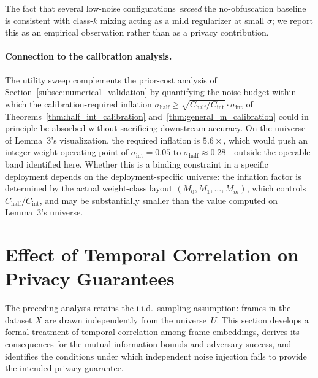 \documentclass[letterpaper]{article} %
\begin{document}
The fact that several low-noise configurations \emph{exceed} the no-obfuscation baseline is consistent with class-$k$ mixing acting as a mild regularizer at small $\sigma$; we report this as an empirical observation rather than as a privacy contribution.

\paragraph{Connection to the calibration analysis.}
The utility sweep complements the prior-cost analysis of Section~\ref{subsec:numerical_validation} by quantifying the noise budget within which the calibration-required inflation $\sigma_{\mathrm{half}} \ge \sqrt{C_{\mathrm{half}}/C_{\mathrm{int}}} \cdot \sigma_{\mathrm{int}}$ of Theorems~\ref{thm:half_int_calibration} and~\ref{thm:general_m_calibration} could in principle be absorbed without sacrificing downstream accuracy. On the universe of Lemma~3's visualization, the required inflation is $5.6\times$, which would push an integer-weight operating point of $\sigma_{\mathrm{int}} = 0.05$ to $\sigma_{\mathrm{half}} \approx 0.28$---outside the operable band identified here. Whether this is a binding constraint in a specific deployment depends on the deployment-specific universe: the inflation factor is determined by the actual weight-class layout $(M_0, M_1, \dots, M_m)$, which controls $C_{\mathrm{half}}/C_{\mathrm{int}}$, and may be substantially smaller than the value computed on Lemma~3's universe.


\section{Effect of Temporal Correlation on Privacy Guarantees}
\label{sec:correlation_analysis}

The preceding analysis retains the i.i.d.\ sampling assumption:
frames in the dataset $X$ are drawn independently from the
universe~$U$. This section develops a formal treatment of
temporal correlation among frame embeddings, derives its
consequences for the mutual information bounds and adversary
success, and identifies the conditions under which
independent noise injection fails to provide the intended
privacy guarantee.
\end{document}
